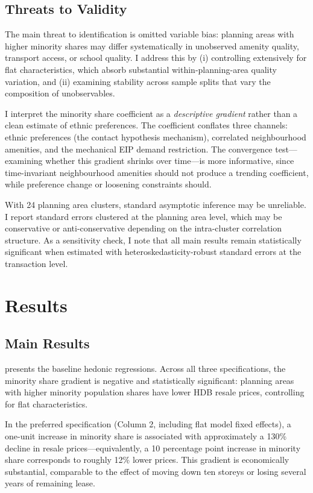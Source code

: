 \documentclass[12pt]{article}
\begin{document}
\subsection{Threats to Validity}

The main threat to identification is omitted variable bias: planning areas with higher minority shares may differ systematically in unobserved amenity quality, transport access, or school quality. I address this by (i) controlling extensively for flat characteristics, which absorb substantial within-planning-area quality variation, and (ii) examining stability across sample splits that vary the composition of unobservables.

I interpret the minority share coefficient as a \textit{descriptive gradient} rather than a clean estimate of ethnic preferences. The coefficient conflates three channels: ethnic preferences (the contact hypothesis mechanism), correlated neighbourhood amenities, and the mechanical EIP demand restriction. The convergence test---examining whether this gradient shrinks over time---is more informative, since time-invariant neighbourhood amenities should not produce a trending coefficient, while preference change or loosening constraints should.

With 24 planning area clusters, standard asymptotic inference may be unreliable. I report standard errors clustered at the planning area level, which may be conservative or anti-conservative depending on the intra-cluster correlation structure. As a sensitivity check, I note that all main results remain statistically significant when estimated with heteroskedasticity-robust standard errors at the transaction level.


\section{Results}
\label{sec:results}

\subsection{Main Results}

 presents the baseline hedonic regressions. Across all three specifications, the minority share gradient is negative and statistically significant: planning areas with higher minority population shares have lower HDB resale prices, controlling for flat characteristics.

In the preferred specification (Column 2, including flat model fixed effects), a one-unit increase in minority share is associated with approximately a 130\% decline in resale prices---equivalently, a 10 percentage point increase in minority share corresponds to roughly 12\% lower prices. This gradient is economically substantial, comparable to the effect of moving down ten storeys or losing several years of remaining lease.
\end{document}
